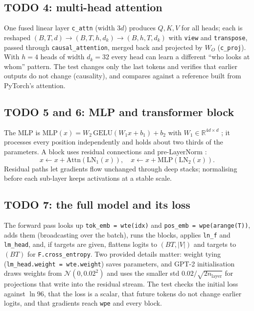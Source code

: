 \documentclass[10pt,twocolumn]{article}
\begin{document}
\subsection{TODO 4: multi-head attention}
One fused linear layer \texttt{c\_attn} (width $3d$) produces $Q,K,V$ for all heads; each is reshaped $(B,T,d)\to(B,T,h,d_k)\to(B,h,T,d_k)$ with \texttt{view} and \texttt{transpose}, passed through \texttt{causal\_attention}, merged back and projected by $W_O$ (\texttt{c\_proj}). With $h=4$ heads of width $d_k=32$ every head can learn a different ``who looks at whom'' pattern. The test changes only the last tokens and verifies that earlier outputs do not change (causality), and compares against a reference built from PyTorch's attention.

\subsection{TODO 5 and 6: MLP and transformer block}
The MLP is $\mathrm{MLP}(x)=W_2\,\mathrm{GELU}(W_1x+b_1)+b_2$ with $W_1\in\mathbb{R}^{4d\times d}$ \cite{hendrycks2016}; it processes every position independently and holds about two thirds of the parameters. A block uses residual connections and pre-LayerNorm \cite{ba2016}:
\begin{equation}
x\leftarrow x+\mathrm{Attn}(\mathrm{LN}_1(x)),\quad x\leftarrow x+\mathrm{MLP}(\mathrm{LN}_2(x)).
\end{equation}
Residual paths let gradients flow unchanged through deep stacks; normalising before each sub-layer keeps activations at a stable scale.

\subsection{TODO 7: the full model and its loss}
The forward pass looks up \texttt{tok\_emb = wte(idx)} and \texttt{pos\_emb = wpe(arange(T))}, adds them (broadcasting over the batch), runs the blocks, applies \texttt{ln\_f} and \texttt{lm\_head}, and, if targets are given, flattens logits to $(BT,|V|)$ and targets to $(BT)$ for \texttt{F.cross\_entropy}. Two provided details matter: weight tying (\texttt{lm\_head.weight = wte.weight}) saves parameters, and GPT-2 initialisation draws weights from $\mathcal N(0,0.02^2)$ and uses the smaller std $0.02/\sqrt{2n_{\text{layer}}}$ for projections that write into the residual stream. The test checks the initial loss against $\ln96$, that the loss is a scalar, that future tokens do not change earlier logits, and that gradients reach \texttt{wpe} and every block.
\end{document}
